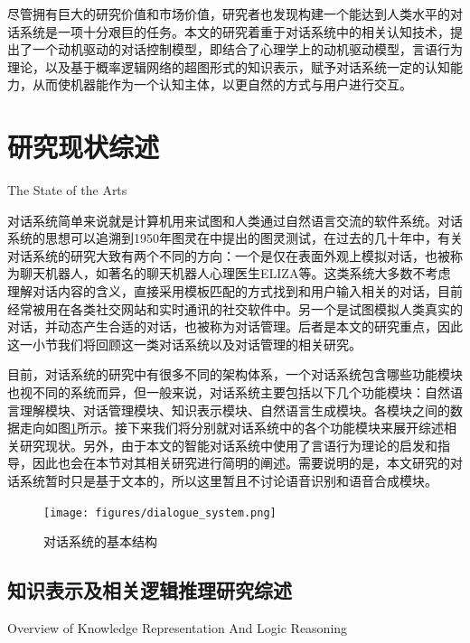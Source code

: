          尽管拥有巨大的研究价值和市场价值，研究者也发现构建一个能达到人类水平的对话系统是一项十分艰巨的任务。本文的研究着重于对话系统中的相关认知技术，提出了一个动机驱动的对话控制模型，即结合了心理学上的动机驱动模型，言语行为理论，以及基于概率逻辑网络的超图形式的知识表示，赋予对话系统一定的认知能力，从而使机器能作为一个认知主体，以更自然的方式与用户进行交互。

\section{研究现状综述}{The State of the Arts}
\label{sec:review}

对话系统简单来说就是计算机用来试图和人类通过自然语言交流的软件系统。对话系统的思想可以追溯到1950年图灵在\cite{Turing1950}中提出的图灵测试，在过去的几十年中，有关对话系统的研究大致有两个不同的方向：一个是仅在表面外观上模拟对话，也被称为聊天机器人，如著名的聊天机器人心理医生ELIZA\cite{Weizenbaum1966}等。这类系统大多数不考虑理解对话内容的含义，直接采用模板匹配的方式找到和用户输入相关的对话，目前经常被用在各类社交网站和实时通讯的社交软件中。另一个是试图模拟人类真实的对话，并动态产生合适的对话，也被称为对话管理。后者是本文的研究重点，因此这一小节我们将回顾这一类对话系统以及对话管理的相关研究。

目前，对话系统的研究中有很多不同的架构体系，一个对话系统包含哪些功能模块也视不同的系统而异，但一般来说，对话系统主要包括以下几个功能模块：自然语言理解模块、对话管理模块、知识表示模块、自然语言生成模块\cite{Arora2013}。各模块之间的数据走向如图\ref{fig:dialogue}所示。接下来我们将分别就对话系统中的各个功能模块来展开综述相关研究现状。另外，由于本文的智能对话系统中使用了言语行为理论的启发和指导，因此也会在本节对其相关研究进行简明的阐述。需要说明的是，本文研究的对话系统暂时只是基于文本的，所以这里暂且不讨论语音识别和语音合成模块。

\begin{figure}[htb]
\centering
\texttt{[image: figures/dialogue\_system.png]}
\caption{对话系统的基本结构}
\label{fig:dialogue}
\end{figure}


\subsection{知识表示及相关逻辑推理研究综述}{Overview of Knowledge Representation And Logic Reasoning}
\label{sec:representationReview}

